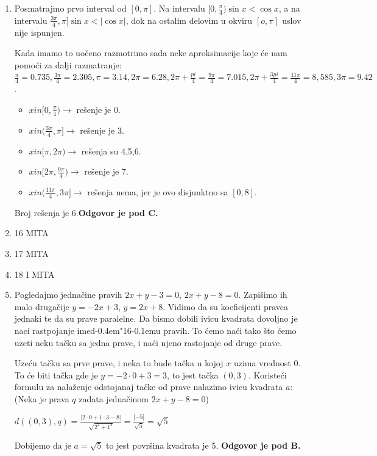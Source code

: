 \documentclass[a4paper,12pt]{report}
\def\dj{d\kern-0.4em\char"16\kern-0.1em}
\begin{document}
\begin{enumerate}[1.]
\item Posmatrajmo prvo interval od $[0,\pi]$. Na intervalu $[0, \frac{\pi}{4}) \sin x < \cos x$, a na intervalu $\frac{3\pi}{4}, \pi] \sin x < |\cos x|$, dok na ostalim delovim u okviru $[o,\pi]$ uslov nije ispunjen.
\par Kada imamo to uo\v{c}eno razmotrimo sada neke aproksimacije koje \'{c}e nam pomo\'{c}i za dalji razmatranje: $\frac{\pi}{4} = 0.735, \frac{3\pi}{4} = 2.305, \pi = 3.14, 2\pi = 6.28, 2\pi + \frac{pi}{4} =\frac{9\pi}{4} = 7.015,2\pi + \frac{3pi}{4} =\frac{11\pi}{4} = 8,585, 3\pi = 9.42$.
\begin{itemize}
\item $x in [0,\frac{\pi}{4})\rightarrow $ re\v{s}enje je 0.
\item $x in (\frac{3\pi}{4}, \pi] \rightarrow $ re\v{s}enje je 3.
\item $x in [\pi, 2\pi) \rightarrow $ re\v{s}enja su 4,5,6.
\item $x in [2\pi, \frac{9\pi}{4}) \rightarrow $ re\v{s}enje je 7.
\item $x in (\frac{11\pi}{4}, 3\pi] \rightarrow $ re\v{s}enja nema, jer je ovo disjunktno sa $[0,8]$.
\end{itemize}
\par Broj re\v{s}enja je 6.\textbf{Odgovor je pod C.} 


\item 16 MITA
\item 17 MITA
\item 18 I MITA

\item Pogledajmo jedna\v{c}ine pravih $2x + y - 3 = 0$, $2x +y -8 = 0$. Zapi\v{s}imo ih malo druga\v{c}ije $y = -2x +3$, $y=  2x + 8$. Vidimo da su koeficijenti pravca jednaki te da su prave paralelne. Da bismo dobili ivicu kvadrata dovoljno je naci rastpojanje ime\dj{}u pravih. To \'{c}emo na\'{c}i tako \v{s}to \'{c}emo uzeti neku ta\v{c}ku sa jedna prave, i na\'{c}i njeno rastojanje od druge prave.
\par Uze\'{c}u ta\v{c}ku sa prve prave, i neka to bude ta\v{c}ka u kojoj $x$ uzima vrednost 0. To \'{c}e biti ta\v{c}ka gde je $y = -2 \cdot 0 +3 = 3$, to jest ta\v{c}ka $(0,3)$. Koriste\'{c}i formulu za nala\v{z}enje odstojanaj ta\v{c}ke od prave nalazimo ivicu kvadrata $a$: (Neka je prava $q$ zadata jedna\v{c}inom $ 2x+y-8 = 0$)
\par $d((0,3), q) = \frac{|2 \cdot 0 + 1 \cdot 3 -8|}{\sqrt{2^2 + 1^2}} = \frac{|-5|}{\sqrt{5}} = \sqrt{5}$
\par Dobijemo da je $a = \sqrt{5}$ to jest povr\v{s}ina kvadrata je 5. \textbf{Odgovor je pod B.} 



\end{enumerate}
\end{document}
